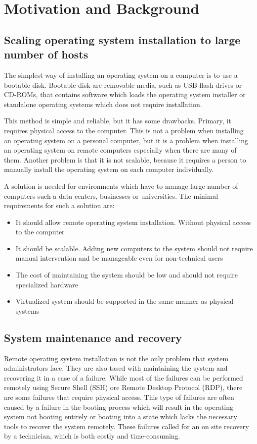 \documentclass[../main.tex]{subfiles}
\begin{document}
\section{Motivation and Background}
\label{sec:motivation-and-background}

\subsection{Scaling operating system installation to large number of hosts}
The simplest way of installing an operating system on a computer is to use a bootable disk.
Bootable disk are removable media, such as USB flash drives or CD-ROMs, that contains software
which loads the operating system installer or standalone operating systems which does not require installation.

This method is simple and reliable, but it has some drawbacks. Primary, it requires physical access to the computer.
This is not a problem when installing an operating system on a personal computer, but it is a problem when installing
an operating system on remote computers especially when there are many of them. Another problem is that it is not
scalable, because it requires a person to manually install the operating system on each computer individually.

A solution is needed for environments which have to manage large number of computers such a data centers, businesses
or universities. The minimal requirements for such a solution are:
\begin{itemize}
  \item It should allow remote operating system installation. Without physical access to the computer
  \item It should be scalable. Adding new computers to the system should not require manual intervention and be manageable even for non-technical users
  \item The cost of maintaining the system should be low and should not require specialized hardware
  \item Virtualized system should be supported in the same manner as physical systems
\end{itemize}

\subsection{System maintenance and recovery}
Remote operating system installation is not the only problem that system administrators face. They are also
tased with maintaining the system and recovering it in a case of a failure. While most of the failures can be performed
remotely using Secure Shell (SSH) ore Remote Desktop Protocol (RDP), there are some failures that require physical access.
This type of failures are often caused by a failure in the booting process which will result in the operating system
not booting entirely or booting into a state which lacks the necessary tools to recover the system remotely.
These failures called for an on site recovery by a technician, which is both costly and time-consuming.
\end{document}
